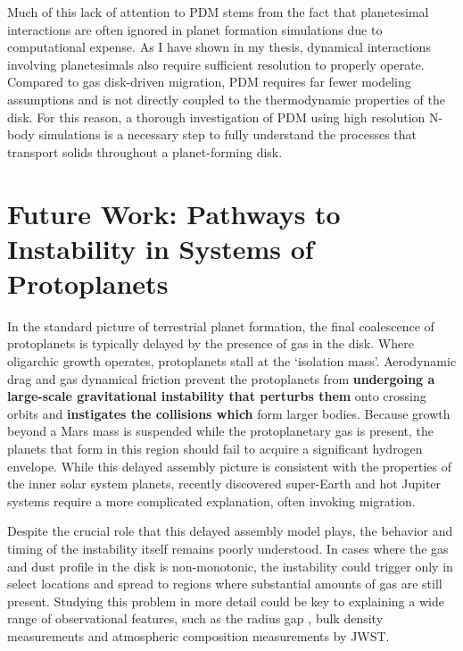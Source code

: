 Much of this lack of attention to PDM stems from the fact that planetesimal interactions are often ignored in planet formation simulations due to computational expense. As I have shown in my thesis, dynamical interactions involving planetesimals also require sufficient resolution to properly operate. Compared to gas disk-driven migration, PDM requires far fewer modeling assumptions and is not directly coupled to the thermodynamic properties of the disk. For this reason, a thorough investigation of PDM using high resolution N-body simulations is a necessary step to fully understand the processes that transport solids throughout a planet-forming disk.

\section{Future Work: Pathways to Instability in Systems of Protoplanets}

In the standard picture of terrestrial planet formation, the final coalescence of protoplanets is typically delayed by the presence of gas in the disk. Where oligarchic growth operates, protoplanets stall at the `isolation mass'. Aerodynamic drag and gas dynamical friction prevent the protoplanets from \textbf{undergoing a large-scale gravitational instability that perturbs them} onto crossing orbits and \textbf{instigates the collisions which} form larger bodies. Because growth beyond a Mars mass is suspended while the protoplanetary gas is present, the planets that form in this region should fail to acquire a significant hydrogen envelope. While this delayed assembly picture is consistent with the properties of the inner solar system planets, recently discovered super-Earth and hot Jupiter systems require a more complicated explanation, often invoking migration.

Despite the crucial role that this delayed assembly model plays, the behavior and timing of the instability itself remains poorly understood. In cases where the gas and dust profile in the disk is non-monotonic, the instability could trigger only in select locations and spread to regions where substantial amounts of gas are still present. Studying this problem in more detail could be key to explaining a wide range of observational features, such as the radius gap \cite{fulton17}, bulk density measurements \cite{lopez14, wolfgang15} and atmospheric composition measurements by JWST.


